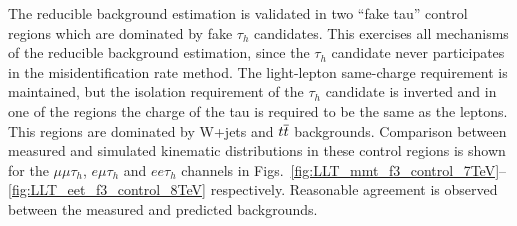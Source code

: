 The reducible background estimation is validated in two ``fake tau'' control regions which are dominated by fake $\tau_h$ candidates.
This exercises all mechanisms of the reducible background estimation, since the $\tau_h$ candidate never participates in the misidentification rate method.
The light-lepton same-charge requirement is maintained, but the isolation requirement of the $\tau_h$ candidate is inverted and in one of the regions the charge of the tau is required to be the same as the leptons.
This regions are dominated by W+jets and $t\overline{t}$ backgrounds.
Comparison between measured and simulated kinematic distributions in these control regions is shown for the $\mu\mu\tau_h$, $e\mu\tau_h$ and $ee\tau_h$ channels in Figs.~\ref{fig:LLT_mmt_f3_control_7TeV}--\ref{fig:LLT_eet_f3_control_8TeV} respectively.
Reasonable agreement is observed between the measured and predicted backgrounds.

